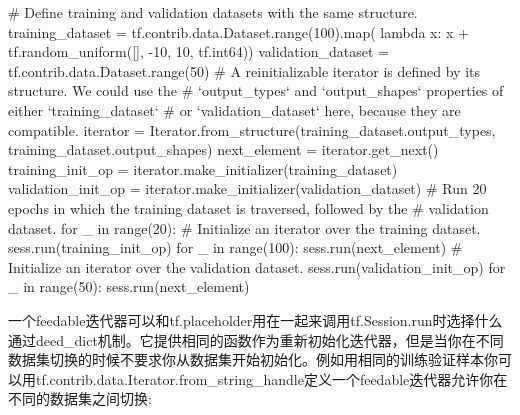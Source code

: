 \begin{python}
# Define training and validation datasets with the same structure.
training_dataset = tf.contrib.data.Dataset.range(100).map(
    lambda x: x + tf.random_uniform([], -10, 10, tf.int64))
validation_dataset = tf.contrib.data.Dataset.range(50)
# A reinitializable iterator is defined by its structure. We could use the
# `output\_types` and `output\_shapes` properties of either `training\_dataset`
# or `validation\_dataset` here, because they are compatible.
iterator = Iterator.from_structure(training_dataset.output_types,
training_dataset.output_shapes)
next_element = iterator.get_next()
training_init_op = iterator.make_initializer(training_dataset)
validation_init_op = iterator.make_initializer(validation_dataset)
# Run 20 epochs in which the training dataset is traversed, followed by the
# validation dataset.
for _ in range(20):
# Initialize an iterator over the training dataset.
    sess.run(training_init_op)
    for _ in range(100):
        sess.run(next_element)
    # Initialize an iterator over the validation dataset.
    sess.run(validation_init_op)
    for _ in range(50):
        sess.run(next_element)
\end{python}
一个feedable迭代器可以和tf.placeholder用在一起来调用tf.Session.run时选择什么通过deed\_dict机制。它提供相同的函数作为重新初始化迭代器，但是当你在不同数据集切换的时候不要求你从数据集开始初始化。例如用相同的训练验证样本你可以用tf.contrib.data.Iterator.from\_string\_handle定义一个feedable迭代器允许你在不同的数据集之间切换:

